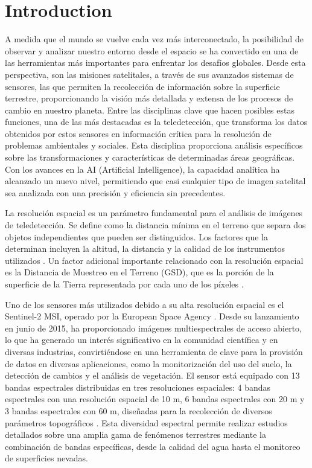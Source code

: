 \chapter{Introduction}

A medida que el mundo se vuelve cada vez más interconectado, la posibilidad de observar y analizar nuestro entorno desde el espacio se ha convertido en una de las herramientas más importantes para enfrentar los desafíos globales. Desde esta perspectiva, son las misiones satelitales, a través de sus avanzados sistemas de sensores, las que permiten la recolección de información sobre la superficie terrestre, proporcionando la visión más detallada y extensa de los procesos de cambio en nuestro planeta. Entre las disciplinas clave que hacen posibles estas funciones, una de las más destacadas es la teledetección, que transforma los datos obtenidos por estos sensores en información crítica para la resolución de problemas ambientales y sociales. Esta disciplina proporciona análisis específicos sobre las transformaciones y características de determinadas áreas geográficas. Con los avances en la  AI (Artificial Intelligence), la capacidad analítica ha alcanzado un nuevo nivel, permitiendo que casi cualquier tipo de imagen satelital sea analizada con una precisión y eficiencia sin precedentes.

La resolución espacial es un parámetro fundamental para el análisis de imágenes de teledetección. Se define como la distancia mínima en el terreno que separa dos objetos independientes que pueden ser distinguidos. Los factores que la determinan incluyen la altitud, la distancia y la calidad de los instrumentos utilizados \autocite{alparone2015remote}. Un factor adicional importante relacionado con la resolución espacial es la Distancia de Muestreo en el Terreno (GSD), que es la porción de la superficie de la Tierra representada por cada uno de los píxeles \autocite{lillesand2015remote}.

Uno de los sensores más utilizados debido a su alta resolución espacial es el Sentinel-2 MSI, operado por la European Space Agency \autocite{Sentinel2_Handbook}. Desde su lanzamiento en junio de 2015, ha proporcionado imágenes multiespectrales de acceso abierto, lo que ha generado un interés significativo en la comunidad científica y en diversas industrias, convirtiéndose en una herramienta de clave para la provisión de datos en diversas aplicaciones, como la monitorización del uso del suelo, la detección de cambios y el análisis de vegetación. El sensor está equipado con 13 bandas espectrales distribuidas en tres resoluciones espaciales: 4 bandas espectrales con una resolución espacial de 10 m, 6 bandas espectrales con 20 m y 3 bandas espectrales con 60 m, diseñadas para la recolección de diversos parámetros topográficos \autocite{lanaras2018super}. Esta diversidad espectral permite realizar estudios detallados sobre una amplia gama de fenómenos terrestres mediante la combinación de bandas específicas, desde la calidad del agua hasta el monitoreo de superficies nevadas.

